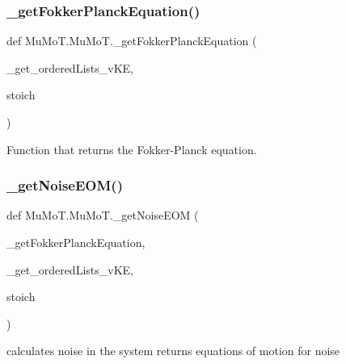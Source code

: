 \mbox{\label{namespace_mu_mo_t_1_1_mu_mo_t_af4a11defe964c17a082b91a97f7f8034}} 
\subsubsection{\texorpdfstring{\+\_\+get\+Fokker\+Planck\+Equation()}{\_getFokkerPlanckEquation()}}
{\footnotesize\ttfamily def Mu\+Mo\+T.\+Mu\+Mo\+T.\+\_\+get\+Fokker\+Planck\+Equation (\begin{DoxyParamCaption}\item[{}]{\+\_\+get\+\_\+ordered\+Lists\+\_\+v\+KE,  }\item[{}]{stoich }\end{DoxyParamCaption})\hspace{0.3cm}{\ttfamily [private]}}



Function that returns the Fokker-\/\+Planck equation. 

\mbox{\label{namespace_mu_mo_t_1_1_mu_mo_t_af8a8a57c2a7c5fc2a4b0a97a8db1fb8d}} 
\subsubsection{\texorpdfstring{\+\_\+get\+Noise\+E\+O\+M()}{\_getNoiseEOM()}}
{\footnotesize\ttfamily def Mu\+Mo\+T.\+Mu\+Mo\+T.\+\_\+get\+Noise\+E\+OM (\begin{DoxyParamCaption}\item[{}]{\+\_\+get\+Fokker\+Planck\+Equation,  }\item[{}]{\+\_\+get\+\_\+ordered\+Lists\+\_\+v\+KE,  }\item[{}]{stoich }\end{DoxyParamCaption})\hspace{0.3cm}{\ttfamily [private]}}



calculates noise in the system returns equations of motion for noise 

